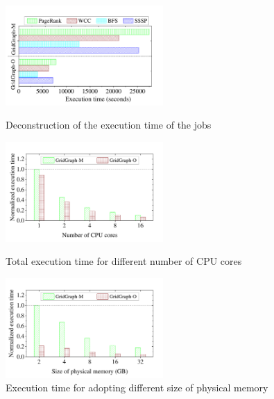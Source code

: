 \documentclass[10pt,journal,compsoc]{IEEEtran}
\begin{document}
\begin{figure}[t]
	\begin{minipage}[t]{0.31\textwidth}
		\centering
		\includegraphics[width=6cm]{deconstruction.pdf}
		\vspace{-0.98cm}
		\caption{Deconstruction of the execution time of the jobs}
		\label{deconstruction}
	\end{minipage}
	\hfill
	\begin{minipage}[t]{0.31\textwidth}
		\centering
		\includegraphics[width=6cm]{Scal_workers.pdf}
		\vspace{-0.98cm}
		\caption{Total execution time for different number of CPU cores}
		\label{Scal_workers}
	\end{minipage}
	\hfill
	\begin{minipage}[t]{0.31\textwidth}
	\centering
	\includegraphics[width=6cm]{Scal_mem.pdf}
	\vspace{-0.98cm}
	\caption{Execution time for adopting different size of physical memory}
	\label{Scal_mem}
	\end{minipage}
	\vspace{-0.77cm}
\end{figure}
\end{document}
